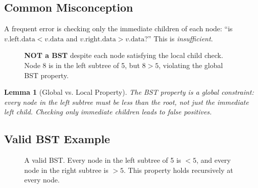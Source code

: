 \documentclass[10pt,journal,compsoc,onecolumn]{IEEEtran}
\newtheorem{lemma}[theorem]{Lemma}
\begin{document}
\subsection{Common Misconception}

A frequent error is checking only the immediate children of each node: ``is $v.\text{left}.\text{data} < v.\text{data}$ and $v.\text{right}.\text{data} > v.\text{data}$?'' This is \emph{insufficient}.

\begin{figure}[htbp]
\centering
{}
\caption{\textbf{NOT a BST} despite each node satisfying the local child check. Node 8 is in the left subtree of 5, but $8 > 5$, violating the global BST property.}
\end{figure}

\begin{lemma}[Global vs. Local Property]
The BST property is a \emph{global} constraint: every node in the left subtree must be less than the root, not just the immediate left child. Checking only immediate children leads to false positives.
\end{lemma}

\subsection{Valid BST Example}

\begin{figure}[htbp]
\centering
{}
\caption{A valid BST. Every node in the left subtree of 5 is $< 5$, and every node in the right subtree is $> 5$. This property holds recursively at every node.}
\end{figure}
\end{document}
